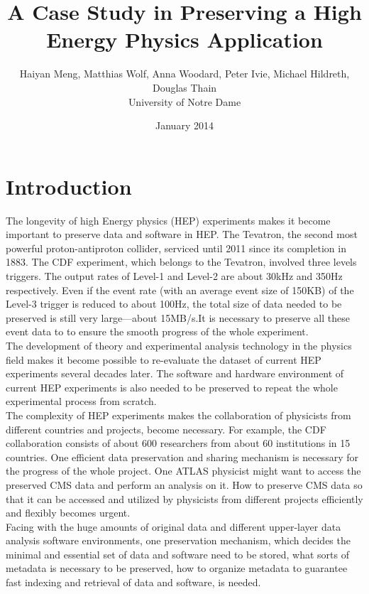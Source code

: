 \documentclass{article}
\begin{document}
\title{A Case Study in Preserving a High Energy Physics Application}
\author{Haiyan Meng, Matthias Wolf, Anna Woodard, Peter Ivie, Michael Hildreth, Douglas Thain\\ University of Notre Dame}
\date{January 2014}
\maketitle

\section{Introduction}
\indent The longevity of high Energy physics (HEP) experiments makes it become important to preserve data and software in HEP. The Tevatron, the second most powerful proton-antiproton collider, serviced until 2011 since its completion in 1883. The CDF experiment, which belongs to the Tevatron, involved three levels triggers. The output rates of Level-1 and Level-2 are about 30kHz and 350Hz respectively. Even if the event rate (with an average event size of 150KB) of the Level-3 trigger is reduced to about 100Hz, the total size of data needed to be preserved is still very large---about 15MB/s.It is necessary to preserve all these event data to to ensure the smooth progress of the whole experiment.\\

The development of theory and experimental analysis technology in the physics field makes it become possible to re-evaluate the dataset of current HEP experiments several decades later. The software and hardware environment of current HEP experiments is also needed to be preserved to repeat the whole experimental process from scratch. \\

The complexity of HEP experiments makes the collaboration of physicists from different countries and projects, become necessary. For example, the CDF collaboration consists of about 600 researchers from about 60 institutions in 15 countries. One efficient data preservation and sharing mechanism is necessary for the progress of the whole project. One ATLAS physicist might want to access the preserved CMS data and perform an analysis on it. How to preserve CMS data so that it can be accessed and utilized by physicists from different projects efficiently and flexibly becomes urgent.\\

Facing with the huge amounts of original data and different upper-layer data analysis software environments, one preservation mechanism, which decides the minimal and essential set of data and software need to be stored, what sorts of metadata is necessary to be preserved, how to organize metadata to guarantee fast indexing and retrieval of data and software, is needed.\\
\end{document}
